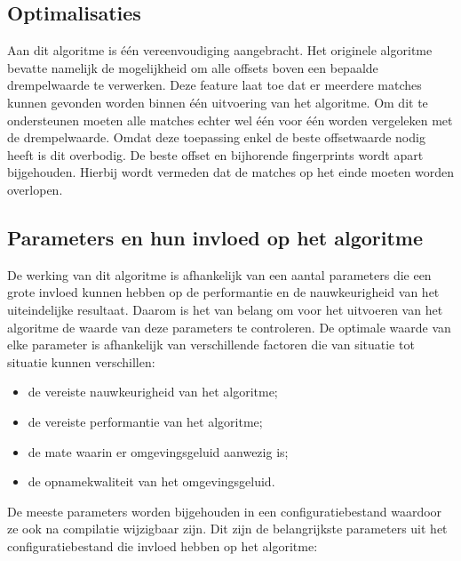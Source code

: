 \subsection{Optimalisaties}

Aan dit algoritme is één vereenvoudiging aangebracht. Het originele algoritme bevatte namelijk de mogelijkheid om alle offsets boven een bepaalde drempelwaarde te verwerken. Deze feature laat toe dat er meerdere matches kunnen gevonden worden binnen één uitvoering van het algoritme. Om dit te ondersteunen moeten alle matches echter wel één voor één worden vergeleken met de drempelwaarde. Omdat deze toepassing enkel de beste offsetwaarde nodig heeft is dit overbodig. De beste offset en bijhorende fingerprints wordt apart bijgehouden. Hierbij wordt vermeden dat de matches op het einde moeten worden overlopen.

\subsection{Parameters en hun invloed op het algoritme}
\label{acoustic-fingerprinting-params}

De werking van dit algoritme is afhankelijk van een aantal parameters die een grote invloed kunnen hebben op de performantie en de nauwkeurigheid van het uiteindelijke resultaat. Daarom is het van belang om voor het uitvoeren van het algoritme de waarde van deze parameters te controleren. De optimale waarde van elke parameter is afhankelijk van verschillende factoren die van situatie tot situatie kunnen verschillen:

\begin{itemize}[noitemsep]
\item de vereiste nauwkeurigheid van het algoritme;
\item de vereiste performantie van het algoritme;
\item de mate waarin er omgevingsgeluid aanwezig is;
\item de opnamekwaliteit van het omgevingsgeluid.
\end{itemize}

De meeste parameters worden bijgehouden in een configuratiebestand waardoor ze ook na compilatie wijzigbaar zijn. Dit zijn de belangrijkste parameters uit het configuratiebestand die invloed hebben op het algoritme:

